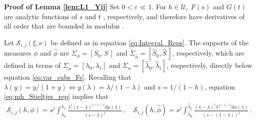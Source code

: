 \documentclass[english,12pt,jmp,graphicx]{revtex4-1}
\newcommand{\ph}{\hat{\phi}}
\begin{document}
\noindent\textbf{Proof of Lemma \ref{lem:L1_Yij} }
%
Set $0<\varepsilon\ll1$. For $h\in\mathcal{U}_\varepsilon$ $F(s)$ and $G(t)$ are analytic
functions of $s$ and $t$ \cite{Golden:CMP-473}, respectively, and
therefore have derivatives of all order that are bounded in modulus
\cite{Rudin:87}. 


Let $\mathcal{S}_{i,j}(\xi,\nu)$ be defined as in equation
\eqref{eq:Integral_Reps}. The supports of the measures $\phi$ and $\ph$
are $\Sigma_\phi=[S_0,S\,]$ and $\Sigma_{\ph}=[\hat{S}_0,\hat{S}\,]$, respectively,
which are defined in terms of $\Sigma_\mu=[\lambda_0,\lambda_1]$ and
$\Sigma_\alpha=[\hat{\lambda}_0,\hat{\lambda}_1]$, respectively, directly below equation
\eqref{eq:var_subs_Fs}. Recalling that $\lambda(y)=y/(1+y)\iff y(\lambda)=\lambda/(1-\lambda)$
and $s=1/(1-h)$, equation \eqref{eq:mh_Stieltjes_rep} implies that
%
\begin{align}\label{eq:Yij_lambda}
  \mathcal{S}_{i,j}(h,\phi)%
      =s^j\int_{\lambda_0}^{\lambda_1}\frac{\lambda^i(1-\lambda)^{j-i-1}d\mu(\lambda)}{(s-\lambda)^j}\,, \quad
\mathcal{S}_{i,j}(h,\ph)=s^j\int_{\hat{\lambda}_0}^{\hat{\lambda}_1}\frac{(1-\lambda)^i\lambda^{j-i-1}d\alpha(\lambda)}{(s-(1-\lambda))^j}\,.    
\end{align}
%
\end{document}
